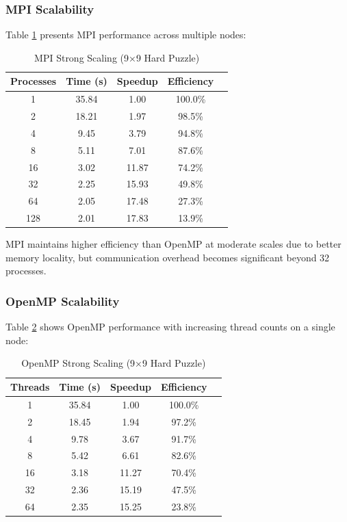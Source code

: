\subsubsection{MPI Scalability}
Table \ref{tab:mpi_scaling} presents MPI performance across multiple nodes:

\begin{table}[htbp]
\caption{MPI Strong Scaling (9×9 Hard Puzzle)}
\begin{center}
\begin{tabular}{@{}ccccc@{}}
\toprule
\textbf{Processes} & \textbf{Time (s)} & \textbf{Speedup} & \textbf{Efficiency} \\
\midrule
1 & 35.84 & 1.00 & 100.0\% \\
2 & 18.21 & 1.97 & 98.5\% \\
4 & 9.45 & 3.79 & 94.8\% \\
8 & 5.11 & 7.01 & 87.6\% \\
16 & 3.02 & 11.87 & 74.2\% \\
32 & 2.25 & 15.93 & 49.8\% \\
64 & 2.05 & 17.48 & 27.3\% \\
128 & 2.01 & 17.83 & 13.9\% \\
\bottomrule
\end{tabular}
\end{center}
\label{tab:mpi_scaling}
\end{table}

MPI maintains higher efficiency than OpenMP at moderate scales due to better memory locality, but communication overhead becomes significant beyond 32 processes.

\subsubsection{OpenMP Scalability}
Table \ref{tab:openmp_scaling} shows OpenMP performance with increasing thread counts on a single node:

\begin{table}[htbp]
\caption{OpenMP Strong Scaling (9×9 Hard Puzzle)}
\begin{center}
\begin{tabular}{@{}ccccc@{}}
\toprule
\textbf{Threads} & \textbf{Time (s)} & \textbf{Speedup} & \textbf{Efficiency} \\
\midrule
1 & 35.84 & 1.00 & 100.0\% \\
2 & 18.45 & 1.94 & 97.2\% \\
4 & 9.78 & 3.67 & 91.7\% \\
8 & 5.42 & 6.61 & 82.6\% \\
16 & 3.18 & 11.27 & 70.4\% \\
32 & 2.36 & 15.19 & 47.5\% \\
64 & 2.35 & 15.25 & 23.8\% \\
\bottomrule
\end{tabular}
\end{center}
\label{tab:openmp_scaling}
\end{table}

